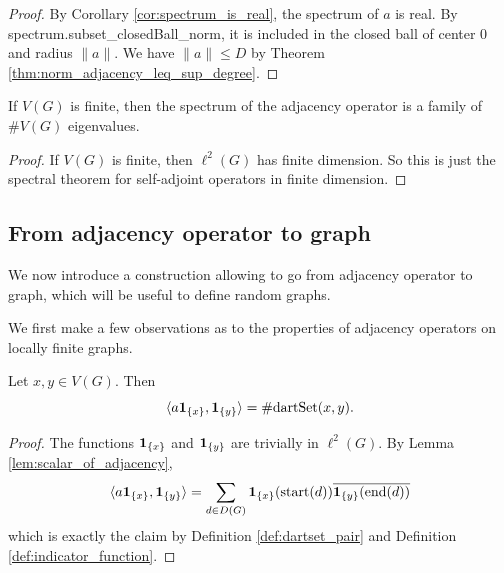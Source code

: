 \begin{proof}
  By Corollary \ref{cor:spectrum_is_real}, the spectrum of $a$ is real.
  By spectrum.subset\_closedBall\_norm,
  it is included in the closed ball of center $0$ and
  radius $\|a\|$.
  We have $\|a\| \leq D$ by Theorem \ref{thm:norm_adjacency_leq_sup_degree}.
\end{proof}

\begin{lemma}
  \label{lem:spectrum_finite}
  If $V(G)$ is finite, then the spectrum of the adjacency operator
  is a family of $\# V(G)$ eigenvalues.
\end{lemma}

\begin{proof}
  If $V(G)$ is finite, then $\ell^2(G)$ has finite dimension.
  So this is just the spectral theorem for self-adjoint operators in finite
  dimension.
\end{proof}

\subsection{From adjacency operator to graph}

We now introduce a construction allowing to go from adjacency operator to graph,
which will be useful to define random graphs.

We first make a few observations as to the properties of adjacency operators on locally
finite graphs.

\begin{lemma}
  \label{lem:coefficients_adjacency_expression}
  Let $x, y \in V(G)$. Then
  \begin{equation*}
    \langle a \mathbf{1}_{\{x\}}, \mathbf{1}_{\{y\}} \rangle
    = \# \mathrm{dartSet}(x,y).
  \end{equation*}
\end{lemma}

\begin{proof}
  The functions $\mathbf{1}_{\{x\}}$ and $\mathbf{1}_{\{y\}}$ are trivially in $\ell^2(G)$.
  By Lemma \ref{lem:scalar_of_adjacency},
  \begin{equation*}
    \langle a \mathbf{1}_{\{x\}}, \mathbf{1}_{\{y\}} \rangle
    = \sum_{d \in D(G)} \mathbf{1}_{\{x\}}(\mathrm{start}(d)) \overline{\mathbf{1}_{\{y\}}(\mathrm{end}(d))}
  \end{equation*}
  which is exactly the claim by Definition \ref{def:dartset_pair} and Definition
  \ref{def:indicator_function}.
\end{proof}

